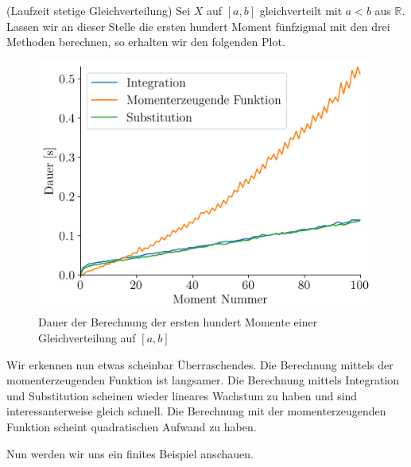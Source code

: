 \begin{Beispiel}{(Laufzeit stetige Gleichverteilung)}
Sei $X$ auf $[a, b]$ gleichverteilt mit $a < b$ aus $\mathbb{R}$. Lassen wir an dieser Stelle die ersten hundert Moment fünfzigmal mit den drei Methoden berechnen, so erhalten wir den folgenden Plot.

\begin{figure}[H]
\centering
\includegraphics[width=0.5\linewidth]{./Section/Momente/Dauer Gleich.png}
\vspace*{-.3\baselineskip}
\caption{Dauer der Berechnung der ersten hundert Momente einer Gleichverteilung auf $[a, b]$}
\end{figure}

Wir erkennen nun etwas scheinbar Überraschendes. Die Berechnung mittels der momenterzeugenden Funktion ist langsamer. Die Berechnung mittels Integration und Substitution scheinen wieder lineares Wachstum zu haben und sind interessanterweise gleich schnell. Die Berechnung mit der momenterzeugenden Funktion scheint quadratischen Aufwand zu haben.
\end{Beispiel}

Nun werden wir uns ein finites Beispiel anschauen.

